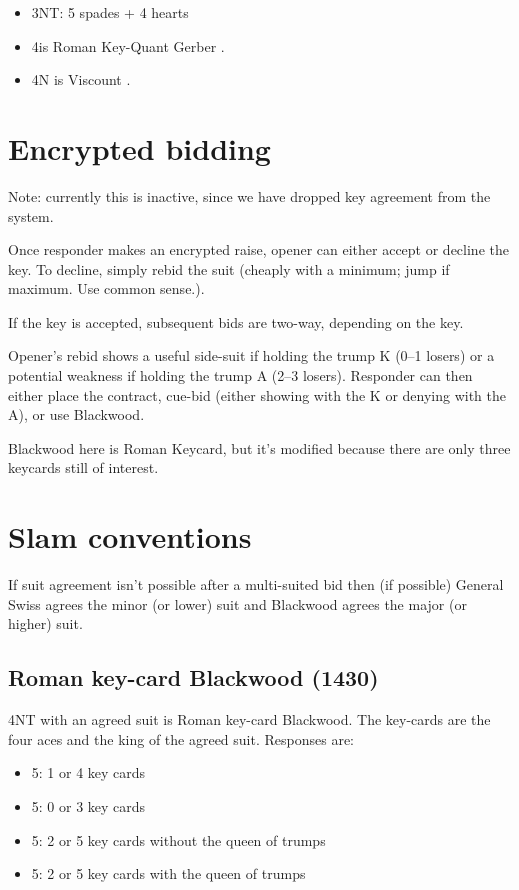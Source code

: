 \documentclass[a4paper,14pt]{extarticle}
\begin{document}
\begin{itemize}
\item 3NT: 5 spades + 4 hearts

\item 4\clubs is Roman Key-Quant Gerber .
\item 4N is Viscount .
\end{itemize}

\newpage

\section{Encrypted bidding}
\label{sec:encryption}

Note: currently this is inactive, since we have dropped key agreement from the system.

Once responder makes an encrypted raise, opener can either accept or decline
the key.  To decline, simply rebid the suit (cheaply with a minimum; jump if
maximum.  Use common sense.).

If the key is accepted, subsequent bids are two-way, depending on the key.

Opener's rebid shows a useful side-suit if holding the trump
K (0--1 losers) or a potential weakness if holding the trump A (2--3 losers).
Responder can then either place the contract, cue-bid (either showing with the
K or denying with the A), or use Blackwood.

Blackwood here is Roman Keycard, but it's modified because there are only three keycards
still of interest.

\section{Slam conventions}
\label{sec:slam}

If suit agreement isn't possible after a multi-suited bid then (if possible)
General Swiss agrees the minor (or lower) suit and Blackwood agrees the major
(or higher) suit.

\subsection{Roman key-card Blackwood (1430)}
\label{sec:rkcb}

4NT with an agreed suit is Roman key-card Blackwood. The key-cards are the four aces
and the king of the agreed suit. Responses are:

\begin{itemize}
\item 5\clubs: 1 or 4 key cards
\item 5\diamonds: 0 or 3 key cards
\item 5\hearts: 2 or 5 key cards without the queen of trumps
\item 5\spades: 2 or 5 key cards with the queen of trumps
\end{itemize}
\end{document}

